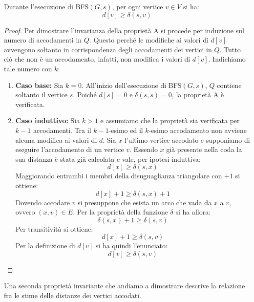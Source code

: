 \begin{propbox}[Proprietà A]
	Durante l'esecuzione di \textsc{BFS}$(G,s)$, per ogni vertice $v \in V$ si ha:
	\begin{displaymath}
		d[v] \geq \delta(s,v)
	\end{displaymath}
\end{propbox}
\begin{proof}
	Per dimostrare l'invarianza della proprietà A si procede per induzione sul numero di accodamenti in $Q$. Questo perché le modifiche ai valori di $d[v]$ avvengono soltanto in corrispondenza degli accodamenti dei vertici in $Q$. Tutto ciò che non è un accodamento, infatti, non modifica i valori di $d[v]$. Indichiamo tale numero con $k$:
\begin{enumerate}
	\item \textbf{Caso base:} Sia $k=0$. All'inizio dell'esecuzione di \textsc{BFS}$(G,s)$, $Q$ contiene soltanto il vertice $s$. Poiché $d[s]=0$ e $\delta(s,s)=0$, la proprietà A è verificata.
	\item \textbf{Caso induttivo:} Sia $k>1$ e assumiamo che la proprietà sia verificata per $k-1$ accodamenti. Tra il $k-1$-esimo ed il $k$-esimo accodamento non avviene alcuna modifica ai valori di $d$. Sia $x$ l'ultimo vertice accodato e supponiamo di eseguire l'accodamento di un vertice $v$. Essendo $x$ già presente nella coda la sua distanza è stata già calcolata e vale, per ipotesi induttiva:
	\[d[x] \geq \delta(s,x)\]
	Maggiorando entrambi i membri della disuguaglianza triangolare con $+1$ si ottiene:
	\[d[x]+1 \geq \delta(s,x)+1\]
	Dovendo accodare $v$ si presuppone che esista un arco che vada da $x$ a $v$, ovvero $(x,v) \in E$. Per la proprietà della funzione $\delta$ si ha allora:
	\[\delta(s,x) + 1 \geq \delta(s,v) \]
	Per transitività si ottiene:
	\[d[x]+1 \geq \delta(s,v)\]
	Per la definizione di $d[v]$ si ha quindi l'enunciato:
	\[d[v] \geq \delta(s,v)\]
\end{enumerate}
\end{proof}

Una seconda proprietà invariante che andiamo a dimostrare descrive la relazione fra le stime delle distanze dei vertici accodati.


